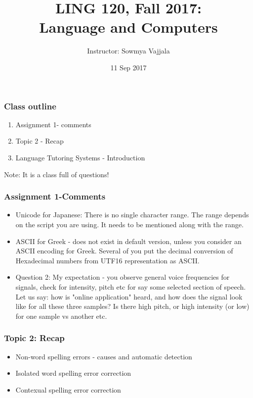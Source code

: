 \documentclass{beamer}
\author[Sowmya Vajjala]{Instructor: Sowmya Vajjala}
\title[LING 120]{LING 120, Fall 2017: \\ Language and Computers}
\date{11 Sep 2017}
\institute{Iowa State University, USA}
\begin{document}
\begin{frame}\titlepage
\end{frame}

\begin{frame}
\frametitle{Class outline}%
\begin{enumerate}
\item Assignment 1- comments
\item Topic 2 - Recap
\item Language Tutoring Systems - Introduction
\end{enumerate}
Note: It is a class full of questions!
\end{frame}

\begin{frame}
\frametitle{Assignment 1-Comments}
\begin{itemize}
\item Unicode for Japanese: There is no single character range. The range depends on the script you are using. It needs to be mentioned along with the range.
\item ASCII for Greek - does not exist in default version, unless you consider an ASCII encoding for Greek. Several of you put the decimal conversion of Hexadecimal numbers from UTF16 representation as ASCII.
\item Question 2: My expectation - you observe general voice frequencies for signals, check for intensity, pitch etc for say some selected section of speech. Let us say: how is "online application" heard, and how does the signal look like for all these three samples? Is there high pitch, or high intensity (or low) for one sample vs another etc. 
\end{itemize}
\end{frame}

\begin{frame}
\frametitle{Topic 2: Recap}
\begin{itemize}
\item Non-word spelling errors - causes and automatic detection
\item Isolated word spelling error correction 
\item Contexual spelling error correction
\end{itemize}
\end{frame}
\end{document}
